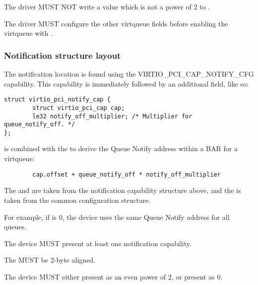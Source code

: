 The driver MUST NOT write a value which is not a power of 2 to .

The driver MUST configure the other virtqueue fields before enabling the virtqueue
with .

\subsubsection{Notification structure layout}\label{sec:Virtio Transport Options / Virtio Over PCI Bus / PCI Device Layout / Notification capability}

The notification location is found using the VIRTIO_PCI_CAP_NOTIFY_CFG
capability.  This capability is immediately followed by an additional
field, like so:

\begin{lstlisting}
struct virtio_pci_notify_cap {
        struct virtio_pci_cap cap;
        le32 notify_off_multiplier; /* Multiplier for queue_notify_off. */
};
\end{lstlisting}

 is combined with the  to
derive the Queue Notify address within a BAR for a virtqueue:

\begin{lstlisting}
        cap.offset + queue_notify_off * notify_off_multiplier
\end{lstlisting}

The  and  are taken from the
notification capability structure above, and the  is
taken from the common configuration structure.

\begin{note}
For example, if  is 0, the device uses
the same Queue Notify address for all queues.
\end{note}

The device MUST present at least one notification capability.

The  MUST be 2-byte aligned.  

The device MUST either present  as an even power of 2,
or present  as 0.

